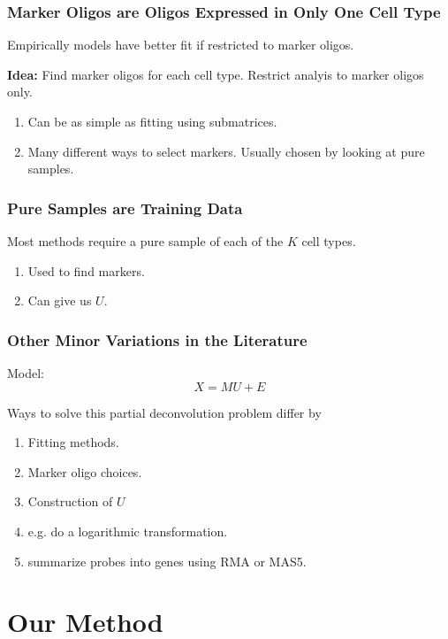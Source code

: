 \documentclass{beamer}
\begin{document}
\begin{frame}
  \frametitle{Marker Oligos are Oligos Expressed in Only One Cell Type}

  {\color{blue}Empirically models have better fit if restricted to marker oligos.\newline}

  {\bf Idea:} Find marker oligos for each cell type. Restrict analyis to marker oligos only.
    \begin{enumerate}
    \item Can be as simple as fitting using submatrices.
    \item Many different ways to select markers. Usually chosen by looking at {\color{blue} pure samples}. 
    \end{enumerate}
\end{frame}

\begin{frame}
  \frametitle{Pure Samples are Training Data}
  Most methods require a pure sample of each of the $K$ cell types. 

  \begin{enumerate}
    \item Used to find markers.
    \item Can give us $U$.
    \end{enumerate}
\end{frame}

\begin{frame}
  \frametitle{Other Minor Variations in the Literature}
  Model:
  \[
  X = MU+E
  \]
  
  Ways to solve this partial deconvolution problem differ by
  \begin{enumerate}
  \item Fitting methods.
  \item Marker oligo choices.
  \item Construction of $U$
  \item {\color{blue}{\bf Transformations:}} e.g. do a logarithmic transformation.
  \item {\color{blue}{\bf Summarizations:}} summarize probes into genes using RMA or MAS5. 
  \end{enumerate}
  
\end{frame}

\setcounter{subsection}{0}
\section{Our Method}
\end{document}
